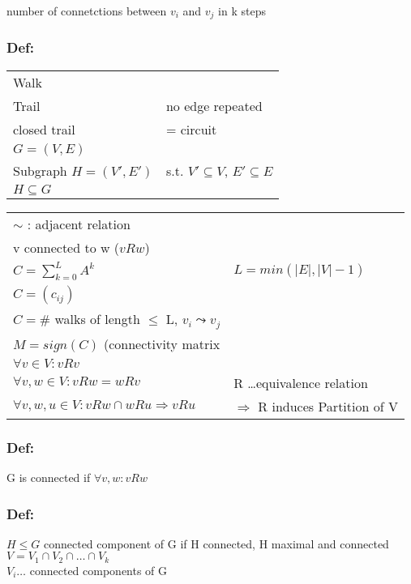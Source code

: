 number of connetctions between $v_i$ and $v_j$ in k steps

\subsubsection*{Def:}
\begin{tabular}{l l}
Walk \\

Trail	& no edge repeated \\

closed trail	& = circuit \\

$G=(V,E)$ \\
Subgraph $ H = (V',E')$	& s.t. $V' \subseteq V$, $E' \subseteq E$ \\
$H \subseteq G$ \\

\end{tabular}

\vspace{12pt}

\begin{tabular}{l l}
$\sim$ : adjacent relation \\

v connected to w ($vRw$) \\

$C = \sum_{k=0}^L A ^k$ 	& $ L = min(|E|, |V| -1)$ \\
$C=(c_{ij}) $ \\
$C = $\# walks of length $\leq$ L, $v_i \leadsto v_j$ \\

$M = sign(C)$ (connectivity matrix\\

$\forall v \in V: vRv$ \\
$\forall v,w \in V: vRw = wRv$ & R \ldots equivalence relation\\
$\forall v,w,u \in V: vRw \cap wRu \Rightarrow vRu$ & $ \Rightarrow$ R induces Partition of V \\

\end{tabular}


\subsubsection*{Def:}
G is connected if $\forall v,w: vRw$

\subsubsection*{Def:}
$ H \leq G$  connected component of G if H connected, H maximal and connected
$V = V_1 \cap V_2 \cap \ldots \cap V_k$ \\
$V_i \ldots $ connected components of G




